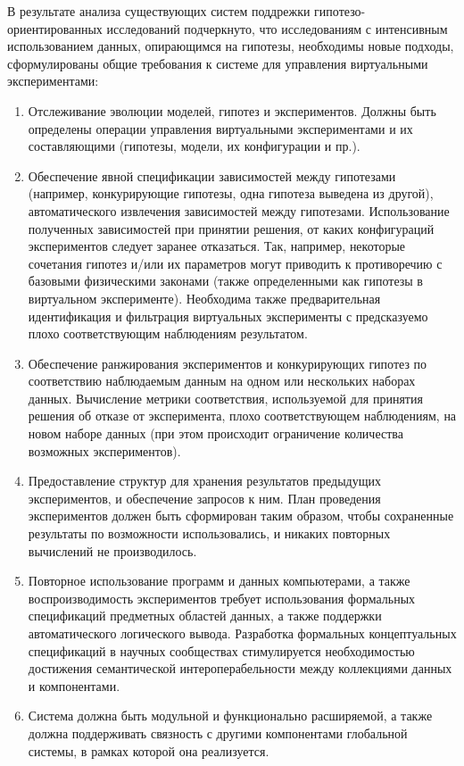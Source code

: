 В результате анализа существующих систем поддрежки гипотезо-ориентированных исследований подчеркнуто, что исследованиям 
с интенсивным использованием данных, опирающимся на гипотезы, необходимы новые подходы, 
сформулированы общие требования к системе для управления виртуальными экспериментами:
\begin{enumerate}
    \item Отслеживание эволюции моделей, гипотез и экспериментов. 
            Должны быть определены операции управления виртуальными экспериментами и их составляющими 
            (гипотезы, модели, их конфигурации и пр.).
    \item Обеспечение явной спецификации зависимостей между гипотезами (например, конкурирующие гипотезы, одна гипотеза 
            выведена из другой), автоматического извлечения зависимостей между гипотезами. Использование полученных 
            зависимостей при принятии решения, от каких конфигураций экспериментов следует заранее 
            отказаться. Так, например, некоторые сочетания гипотез и/или их параметров могут приводить к противоречию с 
            базовыми физическими законами (также определенными как гипотезы в виртуальном эксперименте). Необходима 
            также предварительная идентификация и фильтрация виртуальных эксперименты с предсказуемо плохо 
            соответствующим наблюдениям результатом.
    \item Обеспечение ранжирования экспериментов и конкурирующих гипотез по соответствию наблюдаемым данным на 
            одном или нескольких наборах данных. Вычисление метрики соответствия, используемой для принятия решения об 
            отказе от эксперимента, плохо соответствующем наблюдениям, на новом наборе данных (при этом происходит 
            ограничение количества возможных экспериментов).
    \item Предоставление структур для хранения результатов предыдущих экспериментов, и обеспечение запросов к ним. 
            План проведения экспериментов должен быть сформирован таким образом, чтобы сохраненные результаты по 
            возможности использовались, и никаких повторных вычислений не производилось.
    \item Повторное использование программ и данных компьютерами, а также воспроизводимость экспериментов 
            \cite{Gundersen2018} требует использования формальных спецификаций предметных областей данных, а также 
            поддержки автоматического логического вывода. Разработка формальных концептуальных спецификаций в научных 
            сообществах стимулируется необходимостью достижения семантической интероперабельности между коллекциями 
            данных и компонентами. 
    \item Система должна быть модульной и функционально расширяемой, а также должна поддерживать связность с другими 
            компонентами глобальной системы, в рамках которой она реализуется.
\end{enumerate}

\FloatBarrier

